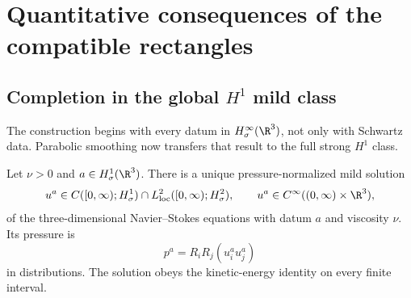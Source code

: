 \section{Quantitative consequences of the compatible rectangles}
\label{u:sec:quantitative-consequences}

\subsection[Completion in the global \texorpdfstring{\(H^1\)}{H1} mild class]
{Completion in the global \(H^1\) mild class}

The construction begins with every datum in
\(H^\infty_\sigma(\R^3)\), not only with Schwartz data.  Parabolic smoothing
now transfers that result to the full strong \(H^1\) class.

\begin{theorem}
\label{u:thm:qc-global-H1-completion}
Let \(\nu>0\) and \(a\in H^1_\sigma(\R^3)\).  There is a unique
pressure-normalized mild solution
\begin{equation}
 u^a\in C([0,\infty);H^1_\sigma)
 \cap L^2_{\rm loc}([0,\infty);H^2_\sigma),
 \qquad
 u^a\in C^\infty((0,\infty)\times\R^3),
 \label{u:eq:qc-global-H1-class}
\end{equation}
of the three-dimensional Navier--Stokes equations with datum \(a\) and
viscosity \(\nu\).  Its pressure is
\[
 p^a=R_iR_j(u_i^a u_j^a)
\]
in distributions.  The solution obeys the kinetic-energy identity on every
finite interval.
\end{theorem}

